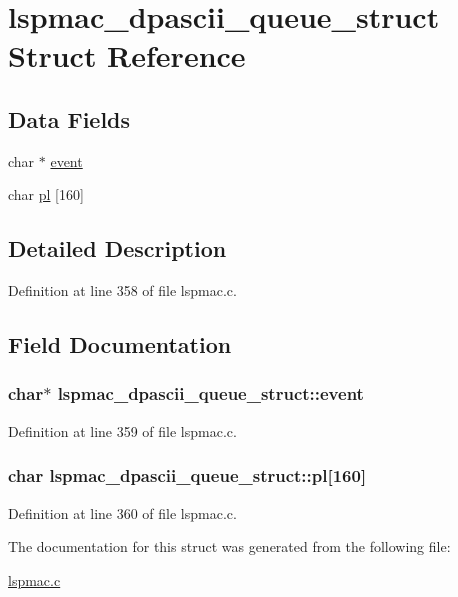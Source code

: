 \hypertarget{structlspmac__dpascii__queue__struct}{\section{lspmac\-\_\-dpascii\-\_\-queue\-\_\-struct Struct Reference}
\label{structlspmac__dpascii__queue__struct}
}
\subsection*{Data Fields}
\begin{DoxyCompactItemize}
\item 
char $\ast$ \hyperlink{structlspmac__dpascii__queue__struct_a8775c09713a917f4ddd80a3a5a8a4668}{event}
\item 
char \hyperlink{structlspmac__dpascii__queue__struct_a318d65317b14eba9e38efd0ab0133a5c}{pl} \mbox{[}160\mbox{]}
\end{DoxyCompactItemize}


\subsection{Detailed Description}


Definition at line 358 of file lspmac.\-c.



\subsection{Field Documentation}
\hypertarget{structlspmac__dpascii__queue__struct_a8775c09713a917f4ddd80a3a5a8a4668}{
\subsubsection[{event}]{\setlength{\rightskip}{0pt plus 5cm}char$\ast$ lspmac\-\_\-dpascii\-\_\-queue\-\_\-struct\-::event}}\label{structlspmac__dpascii__queue__struct_a8775c09713a917f4ddd80a3a5a8a4668}


Definition at line 359 of file lspmac.\-c.

\hypertarget{structlspmac__dpascii__queue__struct_a318d65317b14eba9e38efd0ab0133a5c}{
\subsubsection[{pl}]{\setlength{\rightskip}{0pt plus 5cm}char lspmac\-\_\-dpascii\-\_\-queue\-\_\-struct\-::pl\mbox{[}160\mbox{]}}}\label{structlspmac__dpascii__queue__struct_a318d65317b14eba9e38efd0ab0133a5c}


Definition at line 360 of file lspmac.\-c.



The documentation for this struct was generated from the following file\-:\begin{DoxyCompactItemize}
\item 
\hyperlink{lspmac_8c}{lspmac.\-c}\end{DoxyCompactItemize}
